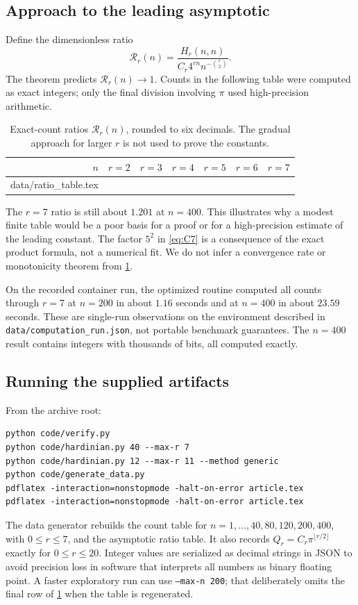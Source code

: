 \documentclass[11pt]{article}
\makeatletter
\numberwithin{equation}{section}
\theoremstyle{definition}
\newcommand{\tableinput}[1]{\@@input #1 }
\makeatother
\begin{document}
\subsection{Approach to the leading asymptotic}
Define the dimensionless ratio
\[
 \mathcal R_r(n)=\frac{H_r(n,n)}{C_r4^{rn}n^{-\binom r2}}.
\]
The theorem predicts $\mathcal R_r(n)\to1$. Counts in the following table were computed as exact integers; only the final division involving $\pi$ used high-precision arithmetic.

\begin{table}[ht]
\centering\small
\setlength{\tabcolsep}{5pt}
\begin{tabular}{@{}rrrrrrr@{}}
\toprule
$n$&$r=2$&$r=3$&$r=4$&$r=5$&$r=6$&$r=7$\\
\midrule
\tableinput{data/ratio_table.tex}
\bottomrule
\end{tabular}
\caption{Exact-count ratios $\mathcal R_r(n)$, rounded to six decimals. The gradual approach for larger $r$ is not used to prove the constants.}
\label{tab:ratios}
\end{table}

The $r=7$ ratio is still about $1.201$ at $n=400$. This illustrates why a modest finite table would be a poor basis for a proof or for a high-precision estimate of the leading constant. The factor $5^2$ in \eqref{eq:C7} is a consequence of the exact product formula, not a numerical fit. We do not infer a convergence rate or monotonicity theorem from \cref{tab:ratios}.

On the recorded container run, the optimized routine computed all counts through $r=7$ at $n=200$ in about $1.16$ seconds and at $n=400$ in about $23.59$ seconds. These are single-run observations on the environment described in \texttt{data/computation\_run.json}, not portable benchmark guarantees. The $n=400$ result contains integers with thousands of bits, all computed exactly.

\subsection{Running the supplied artifacts}
From the archive root:
\begin{lstlisting}
python code/verify.py
python code/hardinian.py 40 --max-r 7
python code/hardinian.py 12 --max-r 11 --method generic
python code/generate_data.py
pdflatex -interaction=nonstopmode -halt-on-error article.tex
pdflatex -interaction=nonstopmode -halt-on-error article.tex
\end{lstlisting}
The data generator rebuilds the count table for $n=1,\ldots,40,80,120,200,400$, with $0\leq r\leq7$, and the asymptotic ratio table. It also records $Q_r=C_r\pi^{\lfloor r/2\rfloor}$ exactly for $0\leq r\leq20$. Integer values are serialized as decimal strings in JSON to avoid precision loss in software that interprets all numbers as binary floating point. A faster exploratory run can use \texttt{--max-n 200}; that deliberately omits the final row of \cref{tab:ratios} when the table is regenerated.
\end{document}
